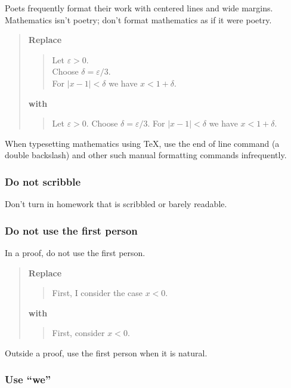 \documentclass[12pt,fleqn]{article}
\newcounter{ex}\setcounter{ex}{0}
\newcounter{id}\setcounter{id}{0}
\newcounter{se}\setcounter{se}{0}
\begin{document}
Poets frequently format their work  with centered lines and wide
margins. Mathematics isn't poetry; don't format mathematics as if it were poetry.


\begin{quote}
\textbf{Replace}
\begin{quote}
\begin{centering}
Let \(\varepsilon > 0\). \\
Choose \(\delta = \varepsilon / 3 \). \\
For \(|x - 1| < \delta \) we have \(x < 1 + \delta\). \\
\end{centering}
\end{quote}
\textbf{with}
\begin{quote}
Let \(\varepsilon > 0\).  Choose \(\delta = \varepsilon / 3 \).
For \(|x - 1| < \delta \) we have \mbox{\(x<1 + \delta\)}.
\end{quote}
\end{quote}
When typesetting mathematics using \TeX, use the end of line command (a double backslash) and other
such manual formatting commands infrequently.

\subsubsection{Do not scribble}

Don’t turn in homework that is scribbled or barely readable.


\subsubsection{Do not use the first person} 

In a proof, do not  use the first person.  

\begin{quote}
\textbf{Replace}
\begin{quote}
First, I consider the case \(x < 0\).
\end{quote}
\textbf{with}
\begin{quote}
 First, consider \(x < 0\).
\end{quote}
\end{quote}

Outside a proof, use the first person when it is natural.

 \subsubsection{  Use ``we''}
\end{document}
